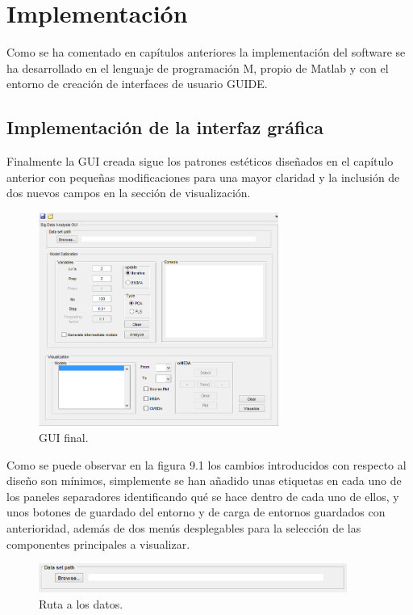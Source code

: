\chapter{Implementación}
Como se ha comentado en capítulos anteriores la implementación del software se ha desarrollado en el lenguaje de programación M, propio de Matlab y con el entorno de creación de interfaces de usuario GUIDE.

\bigskip

\section{Implementación de la interfaz gráfica}

Finalmente la GUI creada sigue los patrones estéticos diseñados en el capítulo anterior con pequeñas modificaciones para una mayor claridad y la inclusión de dos nuevos campos en la sección de visualización.

\begin{figure}[H]
\centering
\includegraphics[width=0.7\textwidth]{imagenes/figuras/9_1.png}
\caption{GUI final.}
\end{figure}

\bigskip

Como se puede observar en la figura 9.1 los cambios introducidos con respecto al diseño son mínimos, simplemente se han añadido unas etiquetas en cada uno de los paneles separadores identificando qué se hace dentro de cada uno de ellos, y unos botones de guardado del entorno y de carga de entornos guardados con anterioridad, además de dos menús desplegables para la selección de las componentes principales a visualizar.

\begin{figure}
\centering
\includegraphics[width=0.9\textwidth]{imagenes/figuras/9_2.png}
\caption{Ruta a los datos.}
\end{figure}

